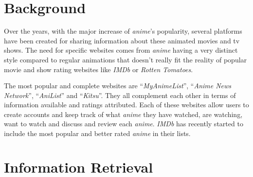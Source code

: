 \documentclass[twocolumn,twoside,11pt,a4paper]{article}
\begin{document}
\section{Background}\label{background}
Over the years, with the major increase of \textit{anime}'s popularity, several platforms have been created for sharing information about these animated movies and tv shows. The need for specific websites comes from \textit{anime} having a very distinct style compared to regular animations that doesn’t really fit the reality of popular movie and show rating websites like \textit{IMDb} or \textit{Rotten Tomatoes}.
\par
The most popular and complete websites are “\textit{MyAnimeList}”, “\textit{Anime News Network}”, “\textit{AniList}” and “\textit{Kitsu}”. They all complement each other in terms of information available and ratings attributed. Each of these websites allow users to create accounts and keep track of what \textit{anime} they have watched, are watching, want to watch and discuss and review each \textit{anime}. \textit{IMDb} has recently started to include the most popular and better rated \textit{anime} in their lists.


\section{Information Retrieval}\label{retrieval}
\end{document}
